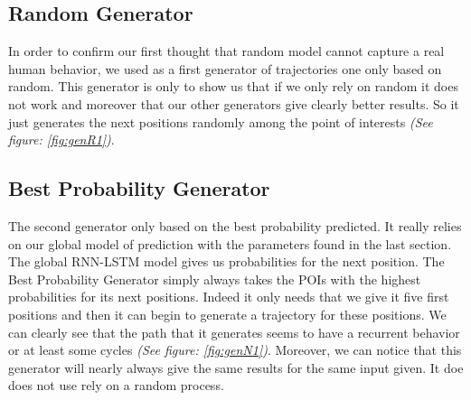 \documentclass[a4]{article}
\begin{document}
\subsection{Random Generator}
In order to confirm our first thought that random model cannot capture a real human behavior, we used as a first generator of trajectories one only based on random. This generator is only to show us that if we only rely on random it does not work and moreover that our other generators give clearly better results. So it just generates the next positions randomly among the point of interests \textit{(See figure: \ref{fig:genR1})}.

\subsection{Best Probability Generator}
The second generator only based on the best probability predicted. It really relies on our global model of prediction with the parameters found in the last section. The global RNN-LSTM model gives us probabilities for the next position. The Best Probability Generator simply always takes the POIs with the highest probabilities for its next positions. Indeed it only needs that we give it five first positions and then it can begin to generate a trajectory for these positions. We can clearly see that the path that it generates seems to have a recurrent behavior or at least some cycles \textit{(See figure: \ref{fig:genN1})}. Moreover, we can notice that this generator will nearly always give the same results for the same input given. It doe does not use rely on a random process.
\end{document}
